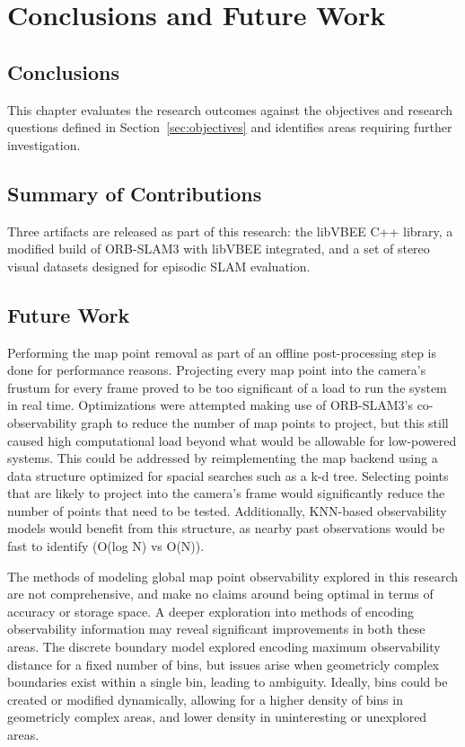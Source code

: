 \section{Conclusions and Future Work}
\label{sec:conclusion}

\subsection{Conclusions}

This chapter evaluates the research outcomes against the objectives and research questions defined in Section~\ref{sec:objectives} and identifies areas requiring further investigation.

\subsection{Summary of Contributions}

Three artifacts are released as part of this research: the libVBEE C++ library, a modified build of ORB-SLAM3 with libVBEE integrated, and a set of stereo visual datasets designed for episodic SLAM evaluation.

\subsection{Future Work}
\label{sec:future_work}

Performing the map point removal as part of an offline post-processing step is done for performance reasons. Projecting every map point into the camera's frustum for every frame proved to be too significant of a load to run the system in real time. Optimizations were attempted making use of ORB-SLAM3's co-observability graph to reduce the number of map points to project, but this still caused high computational load beyond what would be allowable for low-powered systems. This could be addressed by reimplementing the map backend using a data structure optimized for spacial searches such as a k-d tree. Selecting points that are likely to project into the camera's frame would significantly reduce the number of points that need to be tested. Additionally, KNN-based observability models would benefit from this structure, as nearby past observations would be fast to identify (O(log N) vs O(N)).

The methods of modeling global map point observability explored in this research are not comprehensive, and make no claims around being optimal in terms of accuracy or storage space. A deeper exploration into methods of encoding observability information may reveal significant improvements in both these areas. The discrete boundary model explored encoding maximum observability distance for a fixed number of bins, but issues arise when geometricly complex boundaries exist within a single bin, leading to ambiguity. Ideally, bins could be created or modified dynamically, allowing for a higher density of bins in geometricly complex areas, and lower density in uninteresting or unexplored areas.

